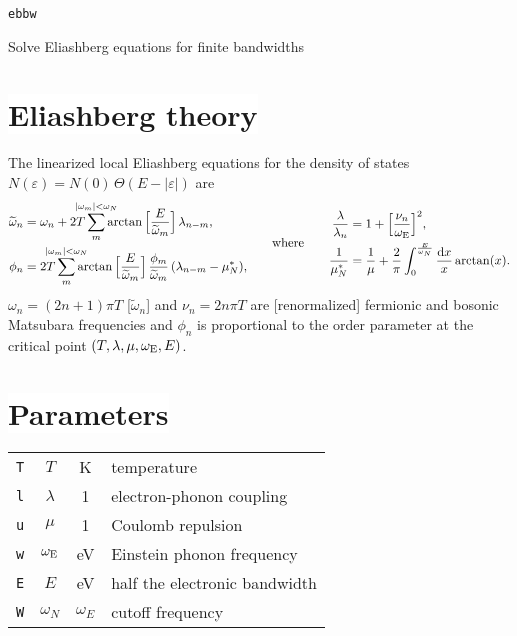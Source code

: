 \documentclass[a4paper]{article}
\def\D{\mathrm d}
\def\sub#1{\sb{\mathrm{#1}}}
\def\limit#1{\sp{\mathclap{#1}}}
\let\tilde\widetilde
\let\epsilon\varepsilon
\let\Theta\varTheta
\def\headline#1{\section*{\normalsize\normalfont%
   \rlap{\rule[0.5ex]{\textwidth}{0.4pt}}\qquad\colorbox{white}{#1}}}
\begin{document}
   \begin{center}
      \LARGE \texttt{ebbw} \par \bigskip
      \large Solve Eliashberg equations for finite bandwidths
   \end{center}

   \headline{Eliashberg theory}

   The linearized local Eliashberg equations for the density of states
   $N(\epsilon) = N(0) \, \Theta(E - |\epsilon|)$ are
   \begin{align*}
      \begin{aligned}
         \tilde \omega_n &= \omega_n + 2 T \sum_m \limit{|\omega_m| < \omega_N}
         \arctan \Big[ \frac E {\tilde \omega_m} \Big] \, \lambda_{n - m},
         \\
         \phi_n &= 2 T \sum_m \limit{|\omega_m| < \omega_N}
         \arctan \Big[ \frac E {\tilde \omega_m} \Big] \,
         \frac{\phi_m}{\tilde \omega_m} \, (\lambda_{n - m} - \mu^*_N),
      \end{aligned}
      \qquad \text{where} \qquad
      \begin{aligned}
         \frac \lambda {\lambda_n} &=
         1 + \Big[ \frac{\nu_n}{\omega \sub E} \Big]^2,
         \\
         \frac 1 {\mu^*_N} &=
         \frac 1 \mu + \frac 2 \pi \int_0^{\frac E {\omega_N}} \frac {\D x} x
         \arctan(x).
      \end{aligned}
   \end{align*}
   $\omega_n = (2 n + 1) \pi T$ [$\tilde \omega_n$] and $\nu_n = 2 n \pi T$ are
   [renormalized] fermionic and bosonic Matsubara frequencies and $\phi_n$ is
   proportional to the order parameter at the critical point $(T, \lambda, \mu,
   \omega \sub E, E)$.

   \headline{Parameters}

   \begin{center}
      \begin{tabular}{r c c l}
         \verb|T| & $T$ & K & temperature \\
         \verb|l| & $\lambda$ & 1 & electron-phonon coupling \\
         \verb|u| & $\mu$ & 1 & Coulomb repulsion \\
         \verb|w| & $\omega \sub E$ & eV & Einstein phonon frequency \\
         \verb|E| & $E$ & eV & half the electronic bandwidth \\
         \verb|W| & $\omega_N$ & $\omega_E$ & cutoff frequency
      \end{tabular}
   \end{center}
\end{document}
